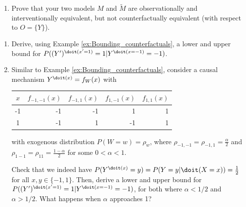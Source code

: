 \begin{enumerate}
\begin{enumerate}
		\emph{Hint: Think of two different causal mechanisms, one which ignores the input orientation, and another one which makes use of it.}

		\item Prove that your two models $M$ and $\tilde{M}$ are observationally and interventionally equivalent, but not counterfactually equivalent (with respect to $O = \{Y\}$).
	\end{enumerate}
	\begin{enumerate}[resume*]
		\item Derive, using Example \ref*{ex:Bounding_counterfactuals}, a lower and upper bound for $P((Y')^{\doit(x'=1)}=1|Y^{\doit(x=-1)}=-1)$.
		\item Similar to Example \ref*{ex:Bounding_counterfactuals}, consider a causal mechanism $Y^{\doit(x)} = f_W(x)$ with
		\begin{center}\begin{tabular}{c|rrrr}
				$x$ & $f_{-1,-1}(x)$ & $f_{-1,1}(x)$ & $f_{1,-1}(x)$ & $f_{1,1}(x)$ \\
				\hline
				-1  & -1             & -1            & 1             & 1            \\
				1   & -1             & 1             & -1            & 1
			\end{tabular}\end{center}
		with exogenous distribution $P(W=w) = \rho_w$, where $\rho_{-1,-1} = \rho_{-1,1} = \tfrac{\alpha}{2}$ and $\rho_{1-1}=\rho_{11}=\tfrac{1-\alpha}{2}$ for some $0 < \alpha < 1$.

		Check that we indeed have $P(Y^{\doit(x)} = y) = P(Y = y|\doit(X=x)) = \tfrac{1}{2}$ for all $x,y\in\{-1,1\}$. Then, derive a lower and upper bound for $P((Y')^{\doit(x'=1)}=1|Y^{\doit(x=-1)}=-1)$, for both where $\alpha < 1/2$ and $\alpha > 1/2$. What happens when $\alpha$ approaches 1?
	\end{enumerate}



\end{enumerate}
